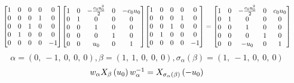 \documentclass[11pt]{article}
\theoremstyle{definition}
\begin{document}
\[
\scaletoalign{\textwidth}{{\left[\begin{matrix}1 & 0 & 0 & 0 & 0\\0 & 0 & 0 & 1 & 0\\0 & 0 & 1 & 0 & 0\\0 & 1 & 0 & 0 & 0\\0 & 0 & 0 & 0 & -1\end{matrix}\right]} {\left[\begin{matrix}1 & 0 & - \frac{c_{0} u_{0}^{2}}{2} & 0 & - c_{0} u_{0}\\0 & 1 & 0 & 0 & 0\\0 & 0 & 1 & 0 & 0\\0 & 0 & 0 & 1 & 0\\0 & 0 & u_{0} & 0 & 1\end{matrix}\right]} {\left[\begin{matrix}1 & 0 & 0 & 0 & 0\\0 & 0 & 0 & 1 & 0\\0 & 0 & 1 & 0 & 0\\0 & 1 & 0 & 0 & 0\\0 & 0 & 0 & 0 & -1\end{matrix}\right]} = {\left[\begin{matrix}1 & 0 & - \frac{c_{0} u_{0}^{2}}{2} & 0 & c_{0} u_{0}\\0 & 1 & 0 & 0 & 0\\0 & 0 & 1 & 0 & 0\\0 & 0 & 0 & 1 & 0\\0 & 0 & - u_{0} & 0 & 1\end{matrix}\right]}}
\]
\[
\alpha = \left( 0, \  -1, \  0, \  0, \  0\right), \beta = \left( 1, \  1, \  0, \  0, \  0\right), \sigma_{\alpha}(\beta) = \left( 1, \  -1, \  0, \  0, \  0\right)
\]
\[
\scaletoalign{\textwidth}{w_{\alpha} X_{\beta}\left(u_{0}\right) w_{\alpha}^{-1} = X_{\sigma_{\alpha}\left(\beta\right)}\left(- u_{0}\right)}
\]
\end{document}
